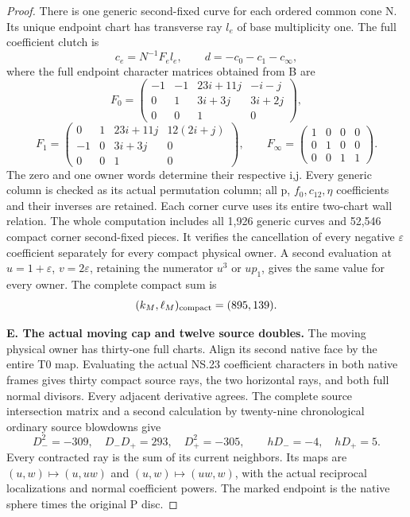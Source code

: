 \begin{proof}
There is one generic second-fixed curve for each ordered common cone N.
Its unique endpoint chart has transverse ray \(l_e\) of base multiplicity
one.  The full coefficient clutch is
\[
c_e=N^{-1}F_el_e,\qquad d=-c_0-c_1-c_\infty,
\]
where the full endpoint character matrices obtained from B are
\[
F_0=\begin{pmatrix}-1&-1&23i+11j&-i-j\\0&1&3i+3j&3i+2j\\0&0&1&0\end{pmatrix},
\]
\[
F_1=\begin{pmatrix}0&1&23i+11j&12(2i+j)\\-1&0&3i+3j&0\\0&0&1&0\end{pmatrix},
\qquad F_\infty=\begin{pmatrix}1&0&0&0\\0&1&0&0\\0&0&1&1\end{pmatrix}.
\]
The zero and one owner words determine their respective i,j.
Every generic column is checked as its actual
permutation column; all p, \(f_0,c_{12},\eta\) coefficients and their
inverses are retained.  Each corner curve uses its entire two-chart wall
relation.  The whole computation includes all 1,926 generic curves and
52,546 compact corner second-fixed pieces.  It verifies the cancellation
of every negative \(\varepsilon\) coefficient separately for every
compact physical owner.  A second evaluation at \(u=1+\varepsilon\),
\(v=2\varepsilon\), retaining the numerator \(u^3\) or \(up_1\),
gives the same value for every owner.  The complete compact sum is
\[
                         (k_M,\ell_M)_{\rm compact}=(895,139).
\]

\medskip\noindent\textbf{E. The actual moving cap and twelve source doubles.}
The moving physical owner has thirty-one full charts.  Align its second
native face by the entire T0 map.  Evaluating the actual NS.23 coefficient
characters in both native frames gives thirty compact source rays, the
two horizontal rays, and both full normal divisors.  Every adjacent
derivative agrees.  The complete source intersection matrix and a second
calculation by twenty-nine chronological ordinary source blowdowns give
\[
D_-^2=-309,\quad D_-D_+=293,\quad D_+^2=-305,
\qquad hD_-=-4,\quad hD_+=5.
\]
Every contracted ray is the sum of its current neighbors.  Its maps are
\((u,w)\mapsto(u,uw)\) and \((u,w)\mapsto(uw,w)\), with the actual
reciprocal localizations and normal coefficient powers.  The marked
endpoint is the native sphere times the original P disc.


\end{proof}
